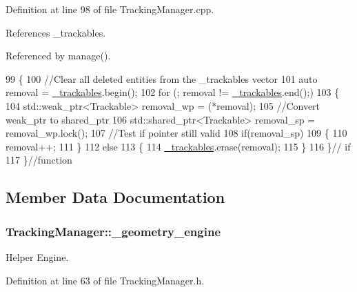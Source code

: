 Definition at line 98 of file Tracking\-Manager.\-cpp.



References \-\_\-trackables.



Referenced by manage().


\begin{DoxyCode}
99 \{
100     \textcolor{comment}{//Clear all deleted entities from the \_trackables vector}
101     \textcolor{keyword}{auto} removal = \hyperlink{classTrackingManager_add21c42cf5a993fbf5a95abd7e36f3dc}{\_trackables}.begin();
102     \textcolor{keywordflow}{for} (; removal != \hyperlink{classTrackingManager_add21c42cf5a993fbf5a95abd7e36f3dc}{\_trackables}.end();)
103     \{
104         std::weak\_ptr<Trackable> removal\_wp = (*removal);
105         \textcolor{comment}{//Convert weak\_ptr to shared\_ptr}
106         std::shared\_ptr<Trackable> removal\_sp = removal\_wp.lock();
107         \textcolor{comment}{//Test if pointer still valid}
108         \textcolor{keywordflow}{if}(removal\_sp)
109         \{
110             removal++;
111         \}
112         \textcolor{keywordflow}{else}
113         \{
114             \hyperlink{classTrackingManager_add21c42cf5a993fbf5a95abd7e36f3dc}{\_trackables}.erase(removal);
115         \}
116     \}\textcolor{comment}{// if}
117 \}\textcolor{comment}{//function}
\end{DoxyCode}


\subsection{Member Data Documentation}
\hypertarget{classTrackingManager_a9bf3e308977ec91b61c7bf5d269f35dd}{
\subsubsection[{\-\_\-geometry\-\_\-engine}]{ Tracking\-Manager\-::\-\_\-geometry\-\_\-engine\hspace{0.3cm}{\ttfamily [private]}}}\label{classTrackingManager_a9bf3e308977ec91b61c7bf5d269f35dd}


Helper Engine. 



Definition at line 63 of file Tracking\-Manager.\-h.



